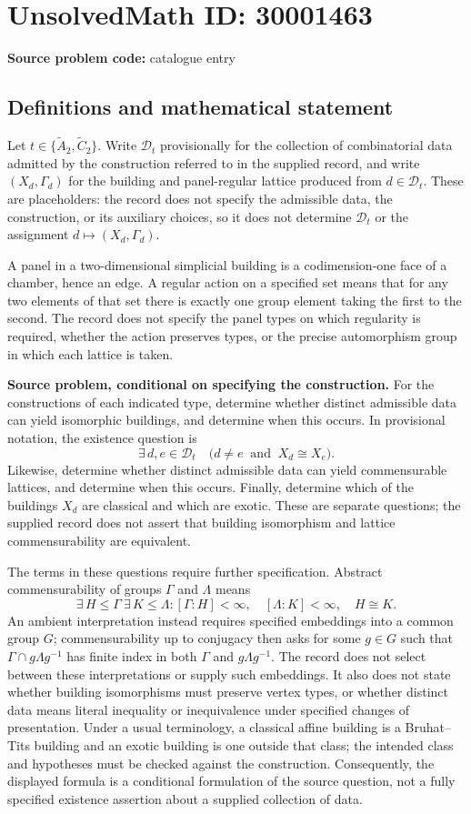 \documentclass[11pt]{article}
\begin{document}
\section*{UnsolvedMath ID: 30001463}
\textbf{Source problem code:} catalogue entry
\subsection{Definitions and mathematical statement}
Let \(t\in\{\widetilde{A}_2,\widetilde{C}_2\}\). Write \(\mathcal D_t\) provisionally for the collection of combinatorial data admitted by the construction referred to in the supplied record, and write \((X_d,\Gamma_d)\) for the building and panel-regular lattice produced from \(d\in\mathcal D_t\). These are placeholders: the record does not specify the admissible data, the construction, or its auxiliary choices, so it does not determine \(\mathcal D_t\) or the assignment \(d\mapsto(X_d,\Gamma_d)\).

A panel in a two-dimensional simplicial building is a codimension-one face of a chamber, hence an edge. A regular action on a specified set means that for any two elements of that set there is exactly one group element taking the first to the second. The record does not specify the panel types on which regularity is required, whether the action preserves types, or the precise automorphism group in which each lattice is taken.

\textbf{Source problem, conditional on specifying the construction.} For the constructions of each indicated type, determine whether distinct admissible data can yield isomorphic buildings, and determine when this occurs. In provisional notation, the existence question is
\[
\exists\,d,e\in\mathcal D_t\quad
\bigl(d\ne e\ \text{ and }\ X_d\cong X_e\bigr).
\]
Likewise, determine whether distinct admissible data can yield commensurable lattices, and determine when this occurs. Finally, determine which of the buildings \(X_d\) are classical and which are exotic. These are separate questions; the supplied record does not assert that building isomorphism and lattice commensurability are equivalent.

The terms in these questions require further specification. Abstract commensurability of groups \(\Gamma\) and \(\Lambda\) means
\[
\exists\,H\leq\Gamma\ \exists\,K\leq\Lambda:
[\Gamma:H]<\infty,\quad[\Lambda:K]<\infty,
\quad H\cong K.
\]
An ambient interpretation instead requires specified embeddings into a common group \(G\); commensurability up to conjugacy then asks for some \(g\in G\) such that \(\Gamma\cap g\Lambda g^{-1}\) has finite index in both \(\Gamma\) and \(g\Lambda g^{-1}\). The record does not select between these interpretations or supply such embeddings. It also does not state whether building isomorphisms must preserve vertex types, or whether distinct data means literal inequality or inequivalence under specified changes of presentation. Under a usual terminology, a classical affine building is a Bruhat--Tits building and an exotic building is one outside that class; the intended class and hypotheses must be checked against the construction. Consequently, the displayed formula is a conditional formulation of the source question, not a fully specified existence assertion about a supplied collection of data.
\end{document}
